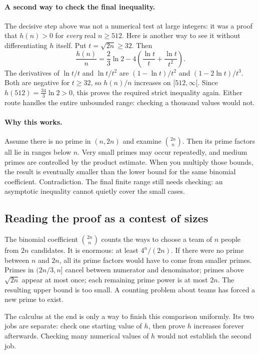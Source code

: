 \paragraph{A second way to check the final inequality.}
The decisive step above was not a numerical test at large integers: it was a proof that $h(n)>0$ for \emph{every} real $n\ge512$. Here is another way to see it without differentiating $h$ itself. Put $t=\sqrt{2n}\ge32$. Then
\[
\frac{h(n)}n=\frac23\ln2-4\left(\frac{\ln t}{t}+\frac{\ln t}{t^2}\right).
\]
The derivatives of $\ln t/t$ and $\ln t/t^2$ are $(1-\ln t)/t^2$ and $(1-2\ln t)/t^3$. Both are negative for $t\ge32$, so $h(n)/n$ increases on $[512,\infty[$. Since $h(512)=\frac{34}{3}\ln2>0$, this proves the required strict inequality again. Either route handles the entire unbounded range: checking a thousand values would not.

\paragraph{Why this works.}
Assume there is no prime in $(n,2n)$ and examine $\binom{2n}{n}$. Then its prime factors all lie in ranges below $n$. Very small primes may occur repeatedly, and medium primes are controlled by the product estimate. When you multiply those bounds, the result is eventually smaller than the lower bound for the same binomial coefficient. Contradiction. The final finite range still needs checking: an asymptotic inequality cannot quietly cover the small cases.

\subsection*{Reading the proof as a contest of sizes}
The binomial coefficient $\binom{2n}n$ counts the ways to choose a team of $n$ people from $2n$ candidates. It is enormous: at least $4^n/(2n)$. If there were no prime between $n$ and $2n$, all its prime factors would have to come from smaller primes. Primes in $(2n/3,n]$ cancel between numerator and denominator; primes above $\sqrt{2n}$ appear at most once; each remaining prime power is at most $2n$. The resulting upper bound is too small. A counting problem about teams has forced a new prime to exist.

The calculus at the end is only a way to finish this comparison uniformly. Its two jobs are separate: check one starting value of $h$, then prove $h$ increases forever afterwards. Checking many numerical values of $h$ would not establish the second job.

